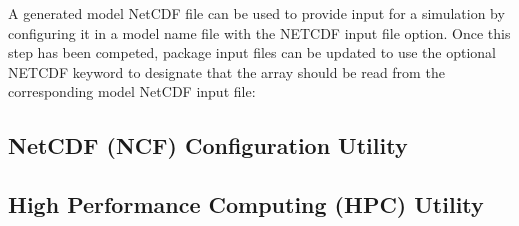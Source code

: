 A generated model NetCDF file can be used to provide input for a simulation by configuring it in a model name file with the NETCDF input file option. Once this step has been competed, package input files can be updated to use the optional NETCDF keyword to designate that the array should be read from the corresponding model NetCDF input file:


\newpage
\subsection{NetCDF (NCF) Configuration Utility}


\newpage
\subsection{High Performance Computing (HPC) Utility}


